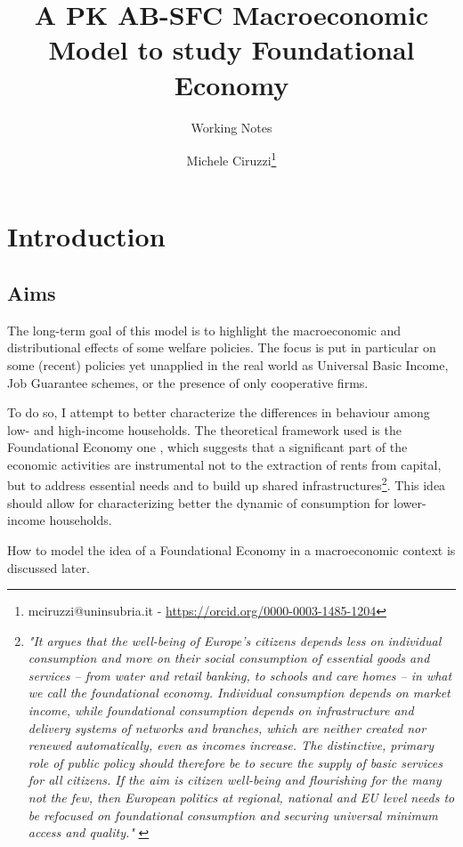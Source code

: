 \documentclass[a4paper, headings=standardclasses]{scrartcl}
\title{A PK AB-SFC Macroeconomic Model to study Foundational Economy\let\thefootnote\relax\footnotetext{
	An updated version of this paper and all the source code and the instructions required to replicate the paper are available at \url{https://github.com/TnTo/FE/}

	\hl{Highlighted} parts of the text indicate substantial choices to be taken.
  }}
\subtitle{Working Notes}
\author{Michele Ciruzzi\thanks{mciruzzi@uninsubria.it - \url{https://orcid.org/0000-0003-1485-1204}}}
\begin{document}
\maketitle


\section{Introduction}
\subsection{Aims}
The long-term goal of this model is to highlight the macroeconomic and distributional effects of some welfare policies.
The focus is put in particular on some (recent) policies yet unapplied in the real world as Universal Basic Income, Job Guarantee schemes, or the presence of only cooperative firms.

To do so, I attempt to better characterize the differences in behaviour among low- and high-income households.
The theoretical framework used is the Foundational Economy one \parencite{arcidiacono2018}, which suggests that a significant part of the economic activities are instrumental not to the extraction of rents from capital, but to address essential needs and to build up shared infrastructures\footnote{\textit{"It argues that the well-being of Europe's citizens depends less on individual consumption and more on their social consumption of essential goods and services – from water and retail banking, to schools and care homes – in what we call the foundational economy. Individual consumption depends on market income, while foundational consumption depends on infrastructure and delivery systems of networks and branches, which are neither created nor renewed automatically, even as incomes increase. The distinctive, primary role of public policy should therefore be to secure the supply of basic services for all citizens. If the aim is citizen well-being and flourishing for the many not the few, then European politics at regional, national and EU level needs to be refocused on foundational consumption and securing universal minimum access and quality."} \parencite{arcidiacono2018}}.
This idea should allow for characterizing better the dynamic of consumption for lower-income households.

How to model the idea of a Foundational Economy in a macroeconomic context is discussed later.
\end{document}
